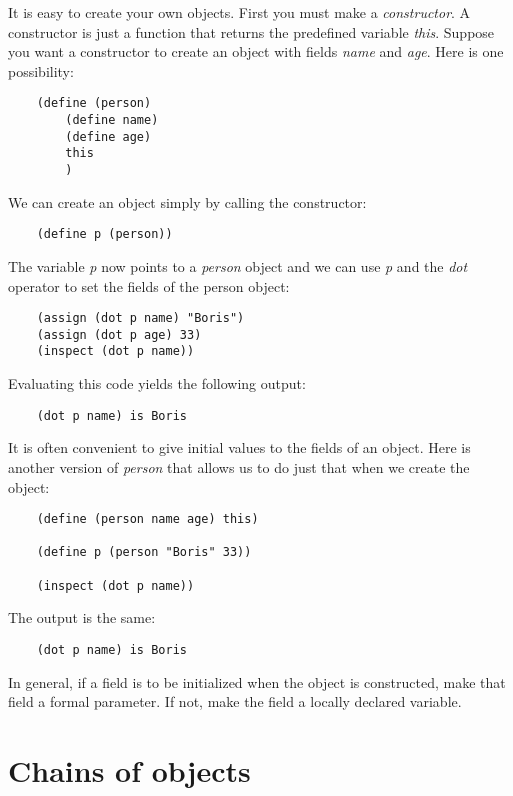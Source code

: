 It is easy to create your own objects. First you must make a
{\it constructor}. A constructor is just a function that returns 
the predefined variable {\it this}. Suppose you want a constructor to
create an object with fields {\it name} and {\it age}. Here is 
one possibility:

\begin{verbatim}
    (define (person)
        (define name)
        (define age)
        this
        )
\end{verbatim}

We can create an object simply by calling the constructor:

\begin{verbatim}
    (define p (person))
\end{verbatim}

The variable {\it p} now points to a {\it person} object and we
can use {\it p} and the {\it dot} operator to
set the fields of the person object:

\begin{verbatim}
    (assign (dot p name) "Boris")
    (assign (dot p age) 33)
    (inspect (dot p name))
\end{verbatim}

Evaluating this code yields the following output:

\begin{verbatim}
    (dot p name) is Boris
\end{verbatim}

It is often convenient to give initial values to the fields of
an object. Here is another version of {\it person} that allows us
to do just that when we create the object:

\begin{verbatim}
    (define (person name age) this)
        
    (define p (person "Boris" 33))
        
    (inspect (dot p name))
\end{verbatim}

The output is the same:

\begin{verbatim}
    (dot p name) is Boris
\end{verbatim}

In general, if a field is to be initialized when the object
is constructed, make that field a formal parameter. If not,
make the field a locally declared variable.

\section{Chains of objects}


